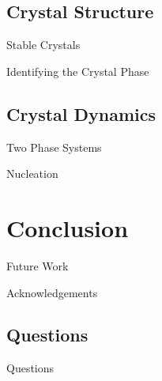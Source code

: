 \documentclass[16pt, aspectratio=43,compress]{beamer}
\begin{document}
\subsection{Crystal Structure}

\begin{frame}{Stable Crystals}
\end{frame}

\begin{frame}{Identifying the Crystal Phase}
\end{frame}

\subsection{Crystal Dynamics}

\begin{frame}{Two Phase Systems}
\end{frame}


\begin{frame}{Nucleation}
    \vspace{-3pt}
\end{frame}

\section{Conclusion}

\begin{frame}{Future Work}
\end{frame}


\begin{frame}{Acknowledgements}
\end{frame}

\subsection{Questions}

\begin{frame}{Questions}
\end{frame}
\end{document}
